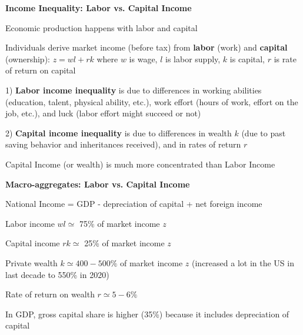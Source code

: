 \documentclass[landscape]{slides}
\begin{document}
\begin{slide}
\begin{center}
{\bf Income Inequality: Labor vs. Capital Income}
\end{center}
Economic production happens with labor and capital

Individuals derive market income (before tax) from {\bf labor} (work) and
{\bf capital} (ownership): $z=wl+rk$ where $w$ is wage, $l$ is labor supply,
$k$ is capital, $r$ is rate of return on capital

1) {\bf Labor income inequality} is due to differences in working abilities
(education, talent, physical ability, etc.), work effort (hours of
work, effort on the job, etc.), and luck (labor effort might
succeed or not)

2) {\bf Capital income inequality} is due to differences in
wealth $k$ (due to past saving behavior and inheritances
received), and in rates of return $r$ 

Capital Income (or wealth) is much more concentrated than Labor
Income


\end{slide}



\begin{slide}
\begin{center}
{\bf Macro-aggregates: Labor vs. Capital Income}
\end{center}

National Income = GDP - depreciation of capital + net foreign income

Labor income $wl \simeq$ 75\% of market income $z$

Capital income $ rk \simeq$ 25\% of market income $z$

Private wealth  $k \simeq 400-500\%$ of market income $z$
(increased a lot in the US in last decade to 550\% in 2020)

Rate of return on wealth $ r \simeq 5-6\%$

In GDP, gross capital share is higher (35\%) because it includes
depreciation of capital


\end{slide}

\begin{slide}

\end{slide}
\end{document}
